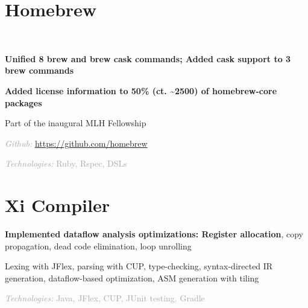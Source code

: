 \documentclass[]{deedy-resume-openfont}
\newcommand{\myurl}[1]{
	\urlstyle{same}\url{#1}
}
\let\sectionold\section
\renewcommand{\section}[1]{
	\sectionold{\textcolor{sectiontitlecolor}{#1}}
}
\begin{document}
\begin{minipage}[t]{0.66\textwidth} 



\section{Homebrew}  \\
\vspace{\topsep} %
\begin{tightemize}
\item \textbf{Unified 8 brew and brew cask commands; Added cask support to 3 brew commands}
\item \textbf{Added license information to 50\% (ct. \textasciitilde 2500) of homebrew-core packages}
\item Part of the inaugural MLH Fellowship
\item \textcolor{darkgray}{\textit{Github:} \myurl{https://github.com/homebrew}}
\item \textcolor{darkgray}{\textit{Technologies:} Ruby, Rspec, DSLs}
\end{tightemize}


\sectionsep

\section{Xi Compiler}
\begin{tightemize}
\item \textbf{Implemented dataflow analysis optimizations: Register allocation}, copy propagation, dead code elimination, loop unrolling
\item Lexing with JFlex, parsing with CUP, type-checking, syntax-directed IR generation, dataflow-based optimization, ASM generation with tiling
\item \textcolor{darkgray}{\textit{Technologies:} Java, JFlex, CUP, JUnit testing, Gradle}
\end{tightemize}

\sectionsep


\end{minipage}
\end{document}
